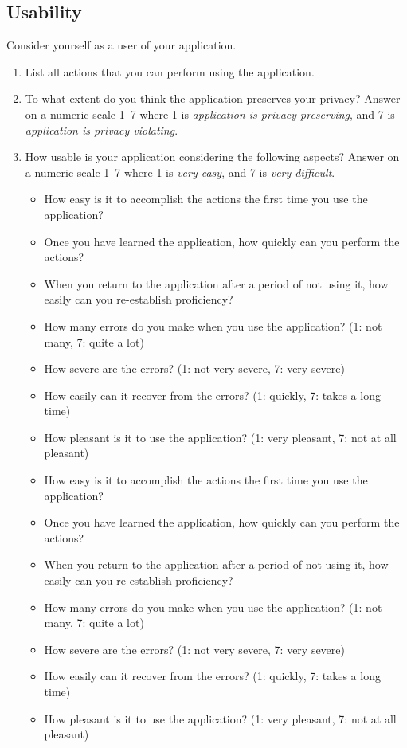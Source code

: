 \subsection*{Usability}
Consider yourself as a user of your application.

\begin{enumerate}
\item List all actions that you can perform using the application.


\item To what extent do you think the application preserves your privacy? 
Answer on a numeric scale 1--7 where 1 is \emph{application is privacy-preserving}, and 7 is \emph{application is privacy violating}.

\item How usable is your application considering the following aspects? 
Answer on a numeric scale 1--7 where 1 is \emph{very easy}, and 7 is \emph{very difficult}.
\begin{itemize}
\item How easy is it to accomplish the actions the first time you use the application?	
\item Once you have learned the application, how quickly can you perform the actions?	
\item When you return to the application after a period of not using it, how easily can you re-establish proficiency?	
\item How many errors do you make when you use the application? (1: not many, 7: quite a lot)	
\item How severe are the errors? (1: not very severe, 7: very severe)	
\item How easily can it recover from the errors? (1: quickly, 7: takes a long time)	
\item How pleasant is it to use the application? (1: very pleasant, 7: not at all pleasant)	
\item How easy is it to accomplish the actions the first time you use the application?	
\item Once you have learned the application, how quickly can you perform the actions?	
\item When you return to the application after a period of not using it, how easily can you re-establish proficiency?	
\item How many errors do you make when you use the application? (1: not many, 7: quite a lot)	
\item How severe are the errors? (1: not very severe, 7: very severe)	
\item How easily can it recover from the errors? (1: quickly, 7: takes a long time)	
\item How pleasant is it to use the application? (1: very pleasant, 7: not at all pleasant)	
\end{itemize}
\end{enumerate}

